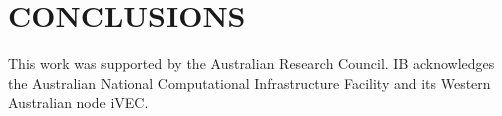 \documentclass[aip
, pra
, showpacs
, aps
, twocolumn
, groupedaddress
, floatfix
]{revtex4}
\begin{document}
\section{CONCLUSIONS}





\begin{acknowledgments}
This work was supported by the Australian Research Council. IB
acknowledges the Australian National Computational Infrastructure
Facility and its Western Australian node iVEC.
\end{acknowledgments}





\end{document}
